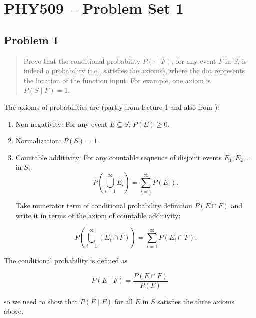 \documentclass[10pt]{article}
\begin{document}
\section{PHY509 – Problem Set 1}

\subsection*{Problem 1}
\begin{quote}
	Prove that the conditional probability $P(\cdot\mid F)$, for any event $F$ in $S$, is indeed a probability (i.e., satisfies the axioms), where the dot represents the location of the function input. For example, one axiom is $P(S\mid F)=1$.
\end{quote}

\divider

The axioms of probabilities are (partly from lecture 1 and also from \cite{statproofbook2023}):
\begin{enumerate}
	\item Non-negativity: For any event $E\subseteq S$, $P(E)\ge 0$.
	\item Normalization: $P(S)=1$.
	\item Countable additivity: For any countable sequence of disjoint events $E_1,E_2,\ldots$ in $S$,
	      \[
		      P\left(\bigcup_{i=1}^\infty E_i\right) = \sum_{i=1}^\infty P(E_i).
	      \]

	      Take numerator term of conditional probability definition $P(E \cap F)$ and write it in terms of the axiom of countable additivity:

	      \[
		      P\left(\bigcup_{i=1}^\infty (E_i \cap F)\right) = \sum_{i=1}^\infty P(E_i \cap F).
	      \]
\end{enumerate}


The conditional probability is defined as

\begin{equation}
	P(E \mid F) = \frac{P(E \cap F)}{P(F)}
\end{equation}

so we need to show that $P(E \mid F)$ for all $E$ in $S$ satisfies the three axioms above.
\end{document}
